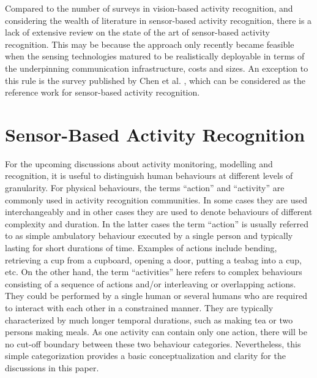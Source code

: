 Compared to the number of surveys in vision-based activity recognition, and considering the wealth of literature in sensor-based activity recognition, there is a lack of extensive review on the state of the art of sensor-based activity recognition. This may be because the approach only recently became feasible when the sensing technologies matured to be realistically deployable in terms of the underpinning communication infrastructure, costs and sizes. An exception to this rule is the survey published by Chen et al. \cite{Chen2012}, which can be considered as the reference work for sensor-based activity recognition. 

\section{Sensor-Based Activity Recognition}
\label{sec:soa:sensor}

For the upcoming discussions about activity monitoring, modelling and recognition, it is useful to distinguish human behaviours at different levels of granularity. For physical behaviours, the terms “action” and “activity” are commonly used in activity recognition communities. In some cases they are used interchangeably and in other cases they are used to denote behaviours of different complexity and duration. In the latter cases the term “action” is usually referred to as simple ambulatory behaviour executed by a single person and typically lasting for short durations of time. Examples of actions include bending, retrieving a cup from a cupboard, opening a door, putting a teabag into a cup, etc. On the other hand, the term “activities” here refers to complex behaviours consisting of a sequence of actions and/or interleaving or overlapping actions. They could be performed by a single human or several humans who are required to interact with each other in a constrained manner. They are typically characterized by much longer temporal durations, such as making tea or two persons making meals. As one activity can contain only one action, there will be no cut-off boundary between these two behaviour categories. Nevertheless, this simple categorization provides a basic conceptualization and clarity for the discussions in this paper.

